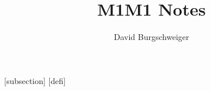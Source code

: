 

\author{David Burgschweiger}
\title{M1M1 Notes}

\geometry{verbose,a4paper,tmargin=2.5cm,bmargin=2.5cm,lmargin=2cm,rmargin=2cm}

\pagestyle{fancy}
\rhead{\thepage}
\cfoot{}

\setlength{\lightrulewidth }{0.01em}
\setlength{\heavyrulewidth }{0.15em}

\theoremstyle{definition}

[subsection]
[defi]


\newtheorem{lm}{Lemma}[section]
\newtheorem{ex}{Example}[defi]
\newtheorem{df}{Definition }[subsection]
\newtheorem{ec}{Exercise}
\newtheorem{pp}{Proposition}

\newenvironment{nex}{\begin{ex} \begin{itemize}}{\end{itemize}\end{ex}}
\newenvironment{itemal}{\hfill \begin{math} \begin{aligned}[t]} {\end{aligned} \end{math} \hfill\null\\ \\}

\newtheorem{tm}{Theorem}[subsection]
\newtheorem{rk}{Remark}[defi]
\newtheorem{pr}{Property}[defi]
\newtheorem{rt}{Result}[subsection]


\newcommand{\R}{\mathbb R}
\newcommand{\N}{\mathbb N}
\newcommand{\Q}{\mathbb Q}
\newcommand{\Z}{\mathbb Z}
\newcommand{\C}{\mathbb C}
\newcommand{\dom}{\operatorname{dom}}
\newcommand{\Arg}{\operatorname{Arg}}


